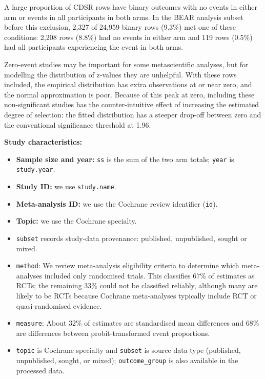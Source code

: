 \documentclass[
  11pt,
]{article}
\begin{document}
A large proportion of CDSR rows have binary outcomes with no events in
either arm or events in all participants in both arms. In the BEAR
analysis subset before this exclusion, 2,327 of 24,959 binary rows
(9.3\%) met one of these conditions: 2,208 rows (8.8\%) had no events in
either arm and 119 rows (0.5\%) had all participants experiencing the
event in both arms.

Zero-event studies may be important for some metascientific analyses,
but for modelling the distribution of z-values they are unhelpful. With
these rows included, the empirical distribution has extra observations
at or near zero, and the normal approximation is poor. Because of this
peak at zero, including these non-significant studies has the
counter-intuitive effect of increasing the estimated degree of
selection: the fitted distribution has a steeper drop-off between zero
and the conventional significance threshold at 1.96.

\textbf{Study characteristics:}

\begin{itemize}
\item
  \textbf{Sample size and year:} \texttt{ss} is the sum of the two arm
  totals; \texttt{year} is \texttt{study.year}.
\item
  \textbf{Study ID:} we use \texttt{study.name}.
\item
  \textbf{Meta-analysis ID:} we use the Cochrane review identifier
  (\texttt{id}).
\item
  \textbf{Topic:} we use the Cochrane specialty.
\item
  \texttt{subset} records study-data provenance: published, unpublished,
  sought or mixed.
\item
  \texttt{method}: We review meta-analysis eligibility criteria to
  determine which meta-analyses included only randomised trials. This
  classifies 67\% of estimates as RCTs; the remaining 33\% could not be
  classified reliably, although many are likely to be RCTs because
  Cochrane meta-analyses typically include RCT or quasi-randomised
  evidence.
\item
  \texttt{measure}: About 32\% of estimates are standardised mean
  differences and 68\% are differences between probit-transformed event
  proportions.
\item
  \texttt{topic} is Cochrane specialty and \texttt{subset} is source
  data type (published, unpublished, sought, or mixed);
  \texttt{outcome\_group} is also available in the processed data.
\end{itemize}
\end{document}
